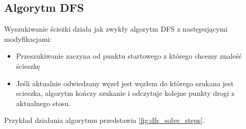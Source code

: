 \documentclass[../../../../doc.tex]{subfiles}
\begin{document}
\subsection{Algorytm DFS}

Wyszukiwanie ścieżki działa jak zwykły algorytm DFS z następującymi modyfikacjami:

\begin{itemize}
  \item Przeszukiwanie zaczyna od punktu startowego z którego chcemy znaleść ścieszkę
  \item Jeśli aktualnie odwiedzany węzeł jest węzłem do którego szukana jest scieszka,
        algorytm kończy szukanie i odczytuje kolejne punkty drogi z aktualnego stosu.
\end{itemize}


Przykład działania algorytmu przedstawia \cref{fig:dfs_solve_steps}.


\end{document}
